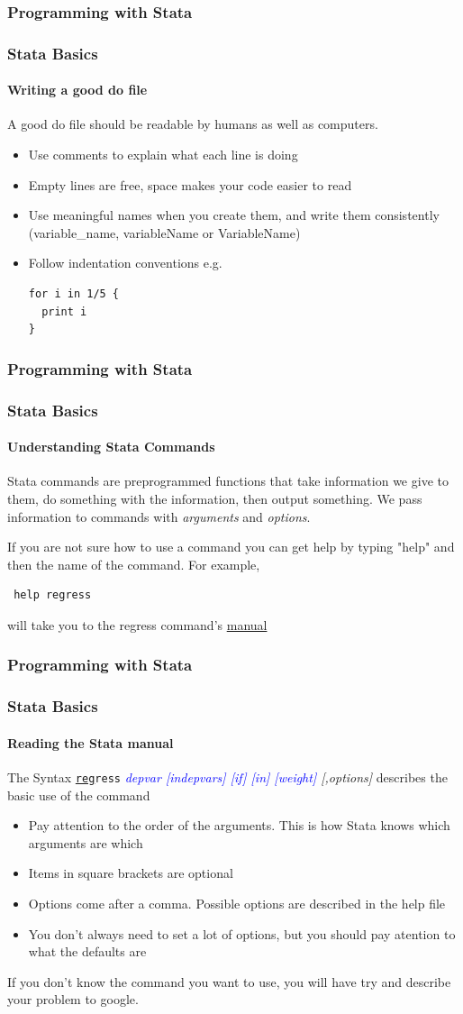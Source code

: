 \documentclass{beamer}
\begin{document}
\begin{frame}[fragile]
  \frametitle{Programming with Stata}
  \frametitle{Stata Basics}
  \framesubtitle{Writing a good do file}
  A good do file should be readable by humans as well as computers.
  \begin{itemize}
    \item Use comments to explain what each line is doing
    \item Empty lines are free, space makes your code easier to read
    \item Use meaningful names when you create them, and write them consistently (variable\_name, variableName or VariableName)
    \item Follow indentation conventions e.g.
    \begin{verbatim}
for i in 1/5 {
  print i
}
    \end{verbatim}
  \end{itemize}
\end{frame}

\begin{frame}[fragile]
  \frametitle{Programming with Stata}
  \frametitle{Stata Basics}
  \framesubtitle{Understanding Stata Commands}
  Stata commands are preprogrammed functions that take information we give to them, do something with the information, then output something. We pass information to commands with \textit{arguments} and \textit{options}.
  
  If you are not sure how to use a command you can get help by typing "help" and then the name of the command. For example,
  \begin{verbatim} help regress \end{verbatim}
  will take you to the regress command's \href{http://www.stata.com/manuals13/rregress.pdf}{manual}
\end{frame}

\begin{frame}
  \frametitle{Programming with Stata}
  \frametitle{Stata Basics}
  \framesubtitle{Reading the Stata manual}
  The Syntax \texttt{\underline{reg}ress} \textit{\textcolor{blue}{depvar [indepvars] [if] [in] [weight]} [,options]} describes the basic use of the command
  \begin{itemize}
    \item Pay attention to the order of the arguments. This is how Stata knows which arguments are which
    \item Items in square brackets are optional
    \item Options come after a comma. Possible options are described in the help file
    \item You don't always need to set a lot of options, but you should pay atention to what the defaults are
  \end{itemize}
  If you don't know the command you want to use, you will have try and describe your problem to google.
\end{frame}
\end{document}
